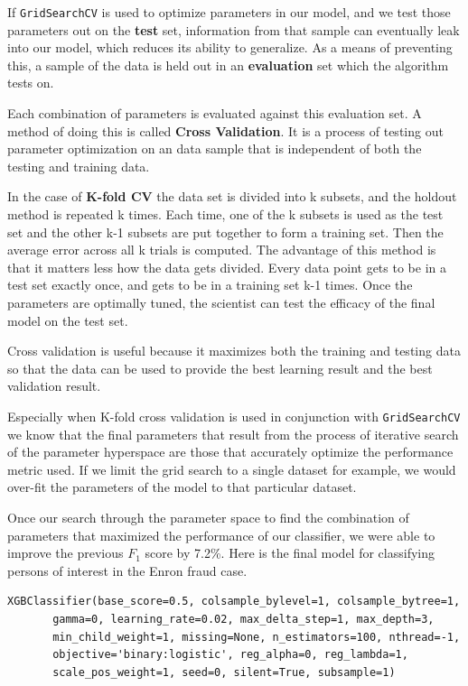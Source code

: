 \documentclass[twoside,openright,titlepage,numbers=noenddot,headinclude,%
               footinclude=true,cleardoublepage=empty,abstractoff,BCOR=5mm,%
               paper=a4,fontsize=11pt,ngerman,american]{scrreprt}
\numberwithin{theorem}{chapter}
\numberwithin{definition}{chapter}
\numberwithin{algorithm}{chapter}
\numberwithin{figure}{chapter}
\numberwithin{table}{chapter}
\numberwithin{equation}{chapter}
\begin{document}
\begin{itemize}
If \texttt{GridSearchCV} is used to optimize parameters in our model, and we test those parameters out on the \textbf{test} set, information from that sample can eventually leak into our model, which reduces its ability to generalize. As a means of preventing this, a sample of the data is held out in an \textbf{evaluation} set which the algorithm tests on. 

Each combination of parameters is evaluated against this evaluation set. A method of doing this is called \textbf{Cross Validation}. It is a process of testing out parameter optimization on an data sample that is independent of both the testing and training data.

In the case of \textbf{K-fold CV} the data set is divided into k subsets, and the holdout method is repeated k times. Each time, one of the k subsets is used as the test set and the other k-1 subsets are put together to form a training set. Then the average error across all k trials is computed. The advantage of this method is that it matters less how the data gets divided. Every data point gets to be in a test set exactly once, and gets to be in a training set k-1 times. Once the parameters are optimally tuned, the scientist can test the efficacy of the final model on the test set. 

Cross validation is useful because it maximizes both the training and testing data so that the data can be used to provide the best learning result and the best validation result. 

Especially when K-fold cross validation is used in conjunction with \texttt{GridSearchCV} we know that the final parameters that result from the process of iterative search of the parameter hyperspace are those that accurately optimize the performance metric used. If we limit the grid search to a single dataset for example, we would over-fit the parameters of the model to that particular dataset.



\end{itemize}

Once our search through the parameter space to find the combination of parameters that maximized the performance of our classifier, we were able to improve the previous $F_1$ score by 7.2\%. Here is the final model for classifying persons of interest in the Enron fraud case.
\begin{verbatim}
XGBClassifier(base_score=0.5, colsample_bylevel=1, colsample_bytree=1,
       gamma=0, learning_rate=0.02, max_delta_step=1, max_depth=3,
       min_child_weight=1, missing=None, n_estimators=100, nthread=-1,
       objective='binary:logistic', reg_alpha=0, reg_lambda=1,
       scale_pos_weight=1, seed=0, silent=True, subsample=1)
\end{verbatim}
\end{document}

